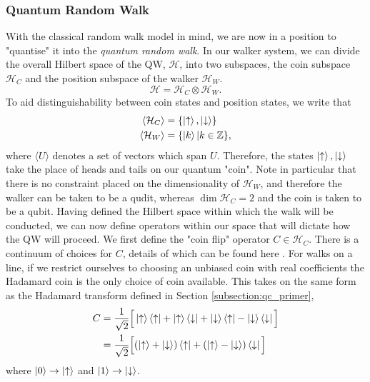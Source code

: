 \subsubsection{Quantum Random Walk}
With the classical random walk model in mind, we are now in a position to "quantise" it into the \emph{quantum random walk}.
In our walker system, we can divide the overall Hilbert space of the QW, $\mathcal{H}$, into two subspaces, the coin subspace $\mathcal{H}_C$ and the position subspace of the walker $\mathcal{H}_W$. 
\begin{equation}
    \mathcal{H} = \mathcal{H}_C \otimes \mathcal{H}_W.
\end{equation}
To aid distinguishability between coin states and position states, we write that
\begin{align}
    \langle\mathcal{H}_C\rangle &= \{\ket{\uparrow}, \ket{\downarrow}\}\\
    \langle\mathcal{H}_W\rangle &= \{\ket{k} | k\in\mathbb{Z}\},
\end{align}
where $\langle U \rangle$ denotes a set of vectors which span $U$. 
Therefore, the states $\ket{\uparrow}, \ket{\downarrow}$ take the place of heads and tails on our quantum "coin". 
Note in particular that there is no constraint placed on the dimensionality of $\mathcal{H}_W$, and therefore the walker can be taken to be a qudit, whereas $\dim{\mathcal{H}_C} = 2$ and the coin is taken to be a qubit.
Having defined the Hilbert space within which the walk will be conducted, we can now define operators within our space that will dictate how the QW will proceed. We first define the "coin flip" operator $C\in \mathcal{H}_C$. 
There is a continuum of choices for $C$, details of which can be found here \cite{Tregenna2003}. 
For walks on a line, if we restrict ourselves to choosing an unbiased coin with real coefficients the Hadamard coin is the only choice of coin available.
This takes on the same form as the Hadamard transform defined in Section \ref{subsection:qc_primer},
\begin{align}
    C &= \frac{1}{\sqrt{2}}\Big[
    \ket{\uparrow}\bra{\uparrow} +
    \ket{\uparrow}\bra{\downarrow} +
    \ket{\downarrow}\bra{\uparrow} -
    \ket{\downarrow}\bra{\downarrow}\Big]\\
    &= \frac{1}{\sqrt{2}}\Big[(\ket{\uparrow} + \ket{\downarrow})\bra{\uparrow} +
    (\ket{\uparrow} - \ket{\downarrow})\bra{\downarrow}\Big]
    \label{equation:hadamard_coin}
\end{align}
where $\ket{0} \rightarrow \ket{\uparrow}$ and $\ket{1} \rightarrow \ket{\downarrow}$.
